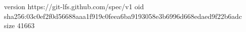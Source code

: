 version https://git-lfs.github.com/spec/v1
oid sha256:03c0ef2f0d56688aaa1f919c0feea6ba9193058e3b6996d668edaed9f22b6adc
size 41663
